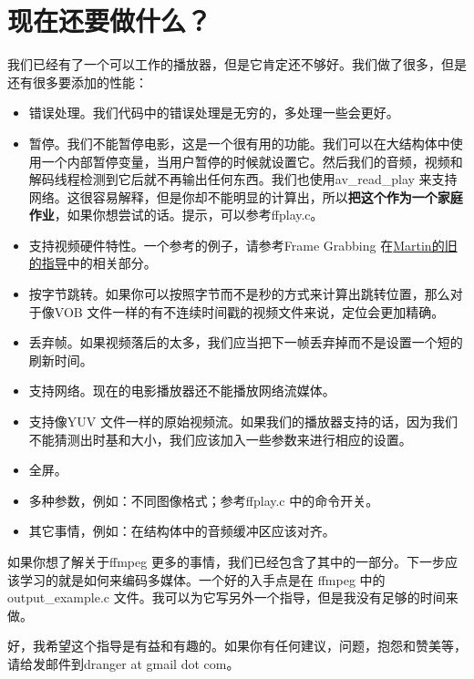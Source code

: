 ﻿\chapter*{现在还要做什么？}
\label{ch9}
我们已经有了一个可以工作的播放器，但是它肯定还不够好。我们做了很多，但是还有很多要添加的性能：
\begin{itemize}
\item 错误处理。我们代码中的错误处理是无穷的，多处理一些会更好。
\item 暂停。我们不能暂停电影，这是一个很有用的功能。我们可以在大结构体中使用一个内部暂停变量，当用户暂停的时候就设置它。然后我们的音频，视频和解码线程检测到它后就不再输出任何东西。我们也使用av_read_play 来支持网络。这很容易解释，但是你却不能明显的计算出，所以\textbf{把这个作为一个家庭作业}，如果你想尝试的话。提示，可以参考ffplay.c。
\item 支持视频硬件特性。一个参考的例子，请参考Frame Grabbing 在\href{http://www.inb.uni-luebeck.de/~boehme/libavcodec_update.html}{Martin的旧的指导}中的相关部分。

\item 按字节跳转。如果你可以按照字节而不是秒的方式来计算出跳转位置，那么对于像VOB 文件一样的有不连续时间戳的视频文件来说，定位会更加精确。
\item 丢弃帧。如果视频落后的太多，我们应当把下一帧丢弃掉而不是设置一个短的刷新时间。
\item 支持网络。现在的电影播放器还不能播放网络流媒体。
\item 支持像YUV 文件一样的原始视频流。如果我们的播放器支持的话，因为我们不能猜测出时基和大小，我们应该加入一些参数来进行相应的设置。
\item 全屏。
\item 多种参数，例如：不同图像格式；参考ffplay.c 中的命令开关。
\item 其它事情，例如：在结构体中的音频缓冲区应该对齐。
\end{itemize}

如果你想了解关于ffmpeg 更多的事情，我们已经包含了其中的一部分。下一步应该学习的就是如何来编码多媒体。一个好的入手点是在 ffmpeg 中的output_example.c 文件。我可以为它写另外一个指导，但是我没有足够的时间来做。

好，我希望这个指导是有益和有趣的。如果你有任何建议，问题，抱怨和赞美等，请给发邮件到dranger at gmail dot com。
